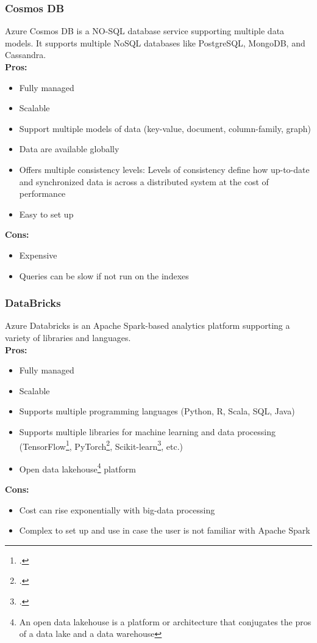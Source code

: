         \subsubsection{Cosmos DB}
        \label{azure:cosmos-db}
 Azure Cosmos DB is a NO-SQL database service supporting multiple data models. It supports multiple NoSQL databases like PostgreSQL, MongoDB, and Cassandra.\\
        \textbf{Pros:}
        \begin{itemize}
            \item Fully managed
            \item Scalable
            \item Support multiple models of data (key-value, document, column-family, graph)
            \item Data are available globally
            \item Offers multiple consistency levels: Levels of consistency define how up-to-date and synchronized data is across a distributed system at the cost of performance
            \item Easy to set up
        \end{itemize}
        \textbf{Cons:}
        \begin{itemize}
            \item Expensive
            \item Queries can be slow if not run on the indexes
        \end{itemize}

        \subsubsection{DataBricks}
        \label{azure:databricks}
 Azure Databricks is an Apache Spark-based analytics platform supporting a variety of libraries and languages.\\
        \textbf{Pros:}
        \begin{itemize}
            \item Fully managed
            \item Scalable
            \item Supports multiple programming languages (Python, R, Scala, SQL, Java)
            \item Supports multiple libraries for machine learning and data processing (TensorFlow\footcite{site:tensorflow}, PyTorch\footcite{site:pytorch}, Scikit-learn\footcite{site:sk-learn}, etc.)
            \item Open data lakehouse\footnote{An open data lakehouse is a platform or architecture that conjugates the pros of a data lake and a data warehouse} platform
        \end{itemize}
        \textbf{Cons:}
        \begin{itemize}
            \item Cost can rise exponentially with big-data processing
            \item Complex to set up and use in case the user is not familiar with Apache Spark
        \end{itemize}

